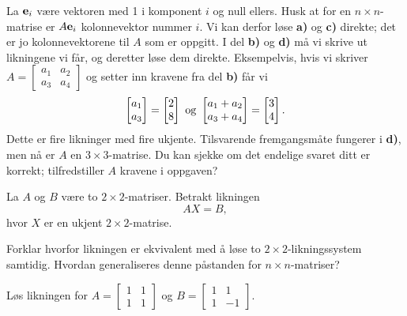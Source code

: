 



\begin{losning}
La $\mathbf{e}_i$ være vektoren med 1 i komponent $i$ og null ellers. Husk at for en $n\times n$-matrise er $A\mathbf{e}_i$ kolonnevektor nummer $i$. Vi kan derfor løse \textbf{a)} og \textbf{c)} direkte; det er jo kolonnevektorene til $A$ som er oppgitt. I del \textbf{b)} og \textbf{d)} må vi skrive ut likningene vi får, og deretter løse dem direkte. Eksempelvis, hvis vi skriver $A=\begin{bmatrix}
a_1 & a_2\\
a_3 & a_4
\end{bmatrix}
$ og setter inn kravene fra del \textbf{b)} får vi $$\begin{bmatrix} a_1 \\ a_3 \end{bmatrix}=\begin{bmatrix} 2 \\ 8 \end{bmatrix} \text{ og } \begin{bmatrix} a_1+a_2 \\ a_3+a_4 \end{bmatrix}=\begin{bmatrix} 3 \\ 4 \end{bmatrix}.$$ Dette er fire likninger med fire ukjente. Tilsvarende fremgangsmåte fungerer i \textbf{d)}, men nå er $A$ en $3\times 3$-matrise. Du kan sjekke om det endelige svaret ditt er korrekt; tilfredstiller $A$ kravene i oppgaven?
\end{losning}




\begin{oppgave}
La $A$ og $B$ være to $2\times 2$-matriser. Betrakt likningen $$AX=B,$$ hvor $X$ er en ukjent $2\times 2$-matrise.

\begin{punkt}
Forklar hvorfor likningen er ekvivalent med å løse to $2\times 2$-likningssystem samtidig. Hvordan generaliseres denne påstanden for $n\times n$-matriser?
\end{punkt}

\begin{punkt}
Løs likningen for $A=\begin{bmatrix}
1 & 1\\
1 & 1
\end{bmatrix}
$ og $B=\begin{bmatrix}
1 & 1\\
1 & -1
\end{bmatrix}.$
\end{punkt}


\end{oppgave}


